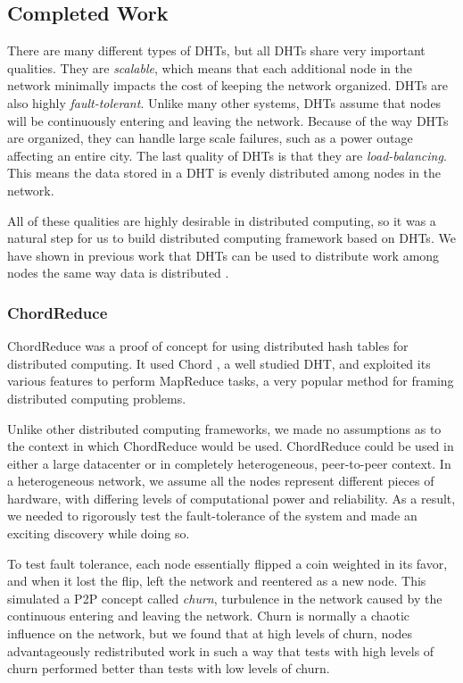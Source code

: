 \documentclass[12pt,a4paper]{article}
\begin{document}
\subsection*{Completed Work}


There are many different types of DHTs, but all DHTs share very important qualities.
They are \textit{scalable}, which means that each additional node in the network minimally impacts the cost of keeping the network organized.
DHTs are also highly \textit{fault-tolerant}.
Unlike many other systems, DHTs assume that nodes will be continuously entering and leaving the network.
Because of the way DHTs are organized, they can handle large scale failures, such as a power outage affecting an entire city.
The last quality of DHTs is that they are  \textit{load-balancing}. 
This means the data stored in a DHT is evenly distributed among nodes in the network.


All of these qualities are highly desirable in distributed computing, so it was a natural step for us to build distributed computing framework based on DHTs.
We have shown in previous work that DHTs can be used to distribute work among nodes the same way data is distributed \cite{chordreduce}.

\subsubsection*{ChordReduce}
ChordReduce \cite{chordreduce} was a proof of concept for using distributed hash tables for distributed computing.  
It used Chord \cite{chord}, a well studied DHT, and exploited its various features to perform MapReduce \cite{mapreduce} tasks, a very popular method for framing distributed computing problems.

Unlike other distributed computing frameworks, we made no assumptions as to the context in which ChordReduce would be used.
ChordReduce could be used in either a large datacenter or in completely heterogeneous, peer-to-peer context.
In a heterogeneous network, we assume all the nodes represent different pieces of hardware, with differing levels of computational power and reliability.
As a result, we needed to rigorously test the fault-tolerance of the system and made an exciting discovery while doing so.

To test fault tolerance, each node essentially flipped a coin weighted in its favor, and when it lost the flip, left the network and reentered as a new node.
This simulated a P2P concept called \textit{churn}, turbulence in the network caused by the continuous entering and leaving the network.
Churn is normally a chaotic influence on the network, but we found that at high levels of churn, nodes advantageously redistributed work in such a way that tests with high levels of churn performed better than tests with low levels of churn.
\end{document}
